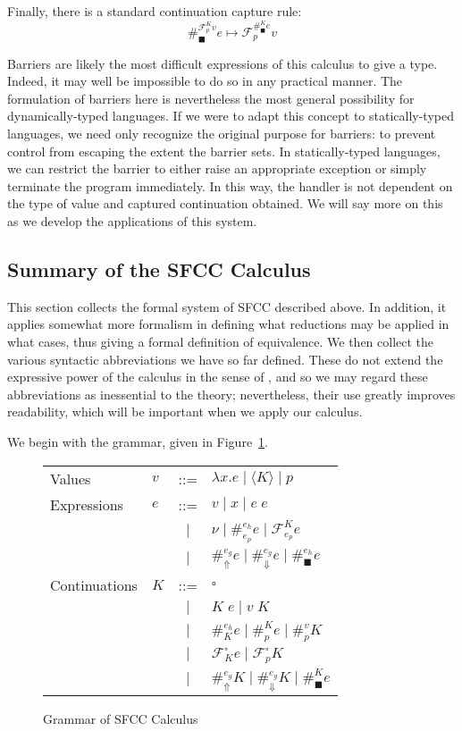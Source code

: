 \documentclass[11pt]{article}
\newcommand{\maybePage}{\newpage}
\newcommand\F{\mathcal{F}}
\newcommand{\angles}[1]{\langle#1\rangle}
\begin{document}
Finally, there is a standard continuation capture rule:
$$\#_\blacksquare^{\F_p^K v}e \mapsto \F_p^{\#_\blacksquare^K e}v$$

Barriers are likely the most difficult expressions of this calculus to give a type.
Indeed, it may well be impossible to do so in any practical manner.
The formulation of barriers here is nevertheless the most general possibility for dynamically-typed languages.
If we were to adapt this concept to statically-typed languages, we need only recognize the original purpose for barriers: to prevent control from escaping the extent the barrier sets.
In statically-typed languages, we can restrict the barrier to either raise an appropriate exception or simply terminate the program immediately.
In this way, the handler is not dependent on the type of value and captured continuation obtained.
We will say more on this as we develop the applications of this system.

\maybePage
\subsection{Summary of the SFCC Calculus}
\label{subsec:summarySFCCcalculus}

This section collects the formal system of SFCC described above.
In addition, it applies somewhat more formalism in defining what reductions may be applied in what cases, thus giving a formal definition of equivalence.
We then collect the various syntactic abbreviations we have so far defined.
These do not extend the expressive power of the calculus in the sense of \cite{Felleisen90expressive}, and so we may regard these abbreviations as inessential to the theory;
nevertheless, their use greatly improves readability, which will be important when we apply our calculus.

We begin with the grammar, given in Figure~\ref{fig:SFCCgrammar}.

\begin{figure}[H]
\caption{Grammar of SFCC Calculus}
\label{fig:SFCCgrammar}

\begin{tabular}{llcl}
Values & $v$ & ::= & $\lambda x.e \mid \angles{K} \mid p$ \\
Expressions & $e$ & ::= &
          $v \mid
           x \mid
           e\;e$ \\
& & $|$ & $\nu \mid
           \#_{e_p}^{e_h}e \mid
           \F_{e_p}^Ke$ \\
& & $|$ & $\#_\Uparrow^{e_g}e \mid
           \#_\Downarrow^{e_g}e \mid
           \#_\blacksquare^{e_h}e$ \\
Continuations & $K$ & ::= &
          $\square$ \\
& & $|$ & $K\;e \mid v\;K$ \\
& & $|$ & $\#_{K}^{e_h}e \mid
           \#_{p}^{K}e \mid
           \#_{p}^{v}K$ \\
& & $|$ & $\F_{K}^{\square}e \mid
           \F_{p}^{\square}K$ \\
& & $|$ & $\#_{\Uparrow}^{e_g}K \mid
           \#_{\Downarrow}^{e_g}K \mid
           \#_{\blacksquare}^{K}e$ \\
\end{tabular}
\end{figure}
\end{document}
